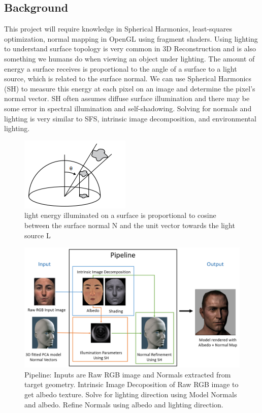 \documentclass[10pt,twocolumn,letterpaper]{article}
\begin{document}
\subsection{Background}
This project will require knowledge in Spherical Harmonics, least-squares optimization, normal mapping in OpenGL using fragment shaders.
Using lighting to understand surface topology is very common in 3D Reconstruction and is also something we humans do when viewing an object under lighting. The amount of energy a surface receives is proportional to the angle of a surface to a light source, which is related to the surface normal. We can use Spherical Harmonics (SH) to measure this energy at each pixel on an image and determine the pixel's normal vector. SH often assumes diffuse surface illumination and there may be some error in spectral illumination and self-shadowing. Solving for normals and lighting is very similar to SFS, intrinsic image decomposition, and environmental lighting.
\begin{figure}[h]
	\begin{center}
		\includegraphics [scale=0.8] {image/energy.png}
	\end{center}
	\caption{light energy illuminated on a surface is proportional to cosine between the surface normal N and the unit vector towards the light source L}
	\label{fig:vgg-16}
\end{figure} 

\begin{figure}[!t]
	\begin{center}
		\includegraphics [scale=0.5] {image/pipeline_img.png}
	\end{center}
	\caption{Pipeline: Inputs are Raw RGB image and Normals extracted from target geometry. Intrinsic Image Decoposition of Raw RGB image to get albedo texture. Solve for lighting direction using Model Normals and albedo. Refine Normals using albedo and lighting direction.}
	\label{fig:pipe2}
\end{figure} 
\end{document}
